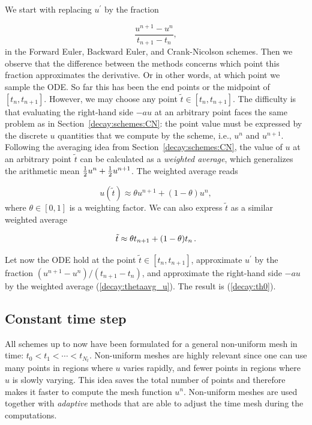 \documentclass[%
oneside,                 %
final,                   %
10pt]{article}
\newenvironment{notice_mdfboxadmon}[1][]{
\begin{notice_mdfboxmdframed}[frametitle=#1]
}
{
\end{notice_mdfboxmdframed}
}
\begin{document}
\begin{notice_mdfboxadmon}[Derivation.]
We start with replacing $u^{\prime}$ by the fraction

\begin{equation*} \frac{u^{n+1}-u^{n}}{t_{n+1}-t_n},\end{equation*}
in the Forward Euler, Backward Euler,
and Crank-Nicolson schemes. Then we observe that
the difference between the methods concerns which point this
fraction approximates the derivative. Or in other words, at which point we
sample the ODE. So far this has been the
end points or the midpoint of $[t_n,t_{n+1}]$. However, we may choose any point
$\tilde t \in [t_n,t_{n+1}]$.
The difficulty
is that evaluating the right-hand side $-au$ at an arbitrary point
faces the same problem as in
Section~\ref{decay:schemes:CN}: the point value must be expressed
by the discrete $u$ quantities that we compute by the scheme, i.e.,
$u^n$ and $u^{n+1}$. Following the averaging idea from
Section~\ref{decay:schemes:CN},
the value of $u$ at an arbitrary point $\tilde t$ can be
calculated as a \emph{weighted average}, which generalizes the arithmetic mean
$\frac{1}{2} u^n + {\frac{1}{2}}u^{n+1}$.
The weighted average reads

\begin{equation}
u(\tilde t) \approx \theta u^{n+1} + (1-\theta) u^{n},
\label{decay:thetaavg_u}
\end{equation}
where $\theta\in [0,1]$ is a weighting factor.
We can also express $\tilde t$ as a similar weighted average

\begin{equation}
\tilde t \approx \theta t_{n+1} + (1-\theta) t_{n}\thinspace .
\label{decay:thetaavg_t}
\end{equation}

Let now the ODE hold at the point
$\tilde t\in [t_n,t_{n+1}]$, approximate $u^{\prime}$ by the fraction
$(u^{n+1}-u^{n})/(t_{n+1}-t_n)$, and approximate the right-hand
side $-au$ by the weighted average (\ref{decay:thetaavg_u}).
The result is (\ref{decay:th0}).
\end{notice_mdfboxadmon}



\subsection{Constant time step}

All schemes up to now have been formulated for a general non-uniform
mesh in time: $t_0 < t_1 < \cdots < t_{N_t}$.
Non-uniform meshes are highly relevant
since one can use many points in regions where $u$ varies rapidly, and
fewer points in regions where $u$ is slowly varying. This idea saves
the total number of points and therefore makes it faster to compute the mesh
function $u^n$. Non-uniform meshes are used together with
\emph{adaptive} methods that are able to adjust the time mesh during the
computations.
\end{document}
